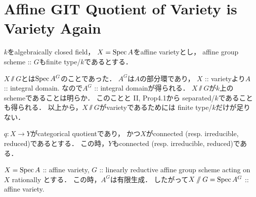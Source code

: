 \documentclass[a4paper]{jsarticle}
\begin{document}
\section{Affine GIT Quotient of Variety is Variety Again }
    $k$をalgebraically closed field，
    $X=\operatorname{Spec} A$をaffine varietyとし，
    affine group scheme :: $G$もfinite type/$k$であるとする．

    $X \sslash G$とは$\operatorname{Spec} A^G$のことであった．
    $A^G$は$A$の部分環であり，
    $X$ :: varietyより$A$ :: integral domain.
    なので$A^G$ :: integral domainが得られる．
    $X \sslash G$が$k$上のschemeであることは明らか．
    このことと\cite{HarAG} II, Prop4.1から
    separated/$k$であることも得られる．
    以上から，$X \sslash G$がvarietyであるためには
    finite type/$k$だけが足りない．

    \begin{Remark}
        $q: X \to Y$がcategorical quotientであり，
        かつ$X$がconnected (resp. irreducible, reduced)であるとする．
        この時，$Y$もconnected (resp. irreducible, reduced)である．
    \end{Remark}

    \begin{Thm}
        $X=\operatorname{Spec} A$ :: affine variety,
        $G$ :: linearly reductive affine group scheme acting on $X$ rationally
        とする．
        この時，$A^G$は有限生成．
        したがって$X \sslash G=\operatorname{Spec} A^G$ :: affine variety.
    \end{Thm}
\end{document}
